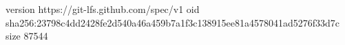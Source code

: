 version https://git-lfs.github.com/spec/v1
oid sha256:23798c4dd2428fe2d540a46a459b7a1f3c138915ee81a4578041ad5276f33d7c
size 87544
